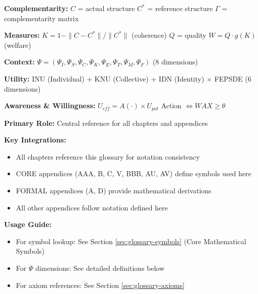 
\begin{tcolorbox}[colback=yellow!10!white, colframe=yellow!75!black,
    title=\textbf{Quick Reference: Core Symbols}]

\textbf{Complementarity:}
$C$ = actual structure \quad $C^*$ = reference structure \quad $\Gamma$ = complementarity matrix

\textbf{Measures:}
$K = 1 - \|C - C^*\|/\|C^*\|$ (coherence) \quad $Q$ = quality \quad $W = Q \cdot g(K)$ (welfare)

\textbf{Context:}
$\Psi = (\Psi_I, \Psi_S, \Psi_C, \Psi_K, \Psi_E, \Psi_T, \Psi_M, \Psi_F)$ (8 dimensions)

\textbf{Utility:}
INU (Individual) + KNU (Collective) + IDN (Identity) $\times$ FEPSDE (6 dimensions)

\textbf{Awareness \& Willingness:}
$U_{eff} = A(\cdot) \times U_{pot}$ \quad Action $\Leftrightarrow WAX \geq \theta$

\end{tcolorbox}


\begin{tcolorbox}[colback=purple!5!white, colframe=purple!75!black,
    title=\textbf{Chapter Linkages}]

\textbf{Primary Role:} Central reference for all chapters and appendices

\textbf{Key Integrations:}
\begin{itemize}[nosep]
    \item All chapters reference this glossary for notation consistency
    \item CORE appendices (AAA, B, C, V, BBB, AU, AV) define symbols used here
    \item FORMAL appendices (A, D) provide mathematical derivations
    \item All other appendices follow notation defined here
\end{itemize}

\textbf{Usage Guide:}
\begin{itemize}[nosep]
    \item For symbol lookup: See Section \ref{sec:glossary-symbols} (Core Mathematical Symbols)
    \item For $\Psi$ dimensions: See detailed definitions below
    \item For axiom references: See Section \ref{sec:glossary-axioms}
\end{itemize}

\end{tcolorbox}

